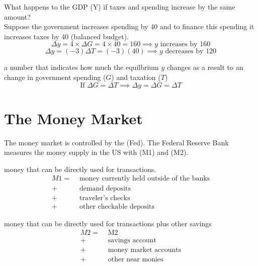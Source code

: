 \documentclass{article}
\begin{document}
\begin{example}
  What happens to the GDP (Y) if taxes and spending increase by the same amount? \\ 

  Suppose the government increases spending by 40 and to finance this spending it increases taxes by 40 (balanced budget).  
  $$\Delta y = 4 \times \Delta G = 4 \times 40 = 160 \implies y \textrm{ increases by } 160$$
  $$\Delta y = (-3) \Delta T = (-3)(40) \implies y \textrm{ decreases by } 120$$
\end{example}

\begin{definition}
  a number that indicates how much the equilbrium $y$ changes as a result to an  change in government spending ($G$) and taxation ($T$) 
  $$\textrm{If } \Delta G = \Delta T \implies \Delta y = \Delta G = \Delta T$$
\end{definition}

\section{The Money Market}

The money market is controlled by the  (Fed). The Federal Reserve Bank measures the money supply in the US with  (M1) and  (M2). 

\begin{definition}
  money that can be directly used for transactions. 
  \begin{align*}
    M1 = &\textrm{ money currently held outside of the banks} \\ 
    + &\textrm{ demand deposits} \\ 
    + &\textrm{ traveler's checks} \\ 
    + &\textrm{ other checkable deposits}
  \end{align*}
\end{definition}

\begin{definition}
  money that can be directly used for transactions plus other savings
  \begin{align*}
    M2 = &\textrm{ M2 } \\ 
    + &\textrm{ savings account} \\
    + &\textrm{ money market accounts} \\ 
    + &\textrm{ other near monies} \\ 
  \end{align*}
\end{definition}
\end{document}
